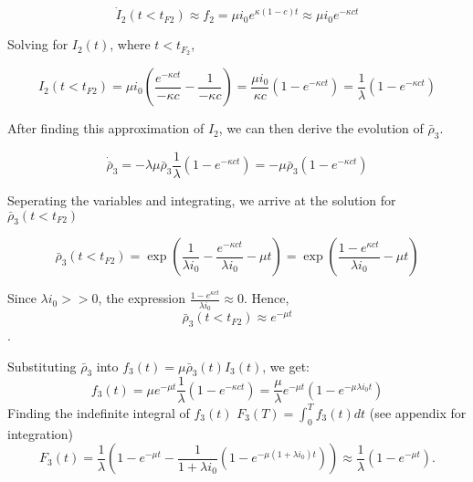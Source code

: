 \begin{equation}\dot I_2(t<t_{F2}) \approx f_2 = \mu i_0 e^{\kappa (1-c) t} \approx \mu i_0 e^{-\kappa c t}\end{equation}

Solving for $I_2(t)$, where $t<t_{F_2}$,

\begin{equation}I_2(t<t_{F2}) = \mu i_0 \left( \frac{e^{-\kappa c t}}{-\kappa c} - \frac{1}{-\kappa c} \right) = \frac{\mu i_0}{\kappa c}\left(1 - e^{-\kappa c t}\right) = \frac{1}{\lambda}\left(1-e^{-\kappa c t}\right) \end{equation}

After finding this approximation of $I_2$, we can then derive the evolution of $\bar \rho_3$. 

\begin{equation}\dot{\bar{\rho}}_3 = - \lambda \mu \bar{\rho}_3 \frac{1}{\lambda}\left(1 - e^{-\kappa c t}\right) =  - \mu \bar{\rho}_3\left(1 - e^{-\kappa c t}\right)\end{equation}

Seperating the variables and integrating, we arrive at the solution for $\bar \rho_3(t<t_{F2})$ 


\begin{equation}\bar \rho_3(t<t_{F2}) = \exp\left( \frac{1}{\lambda i_0} - \frac{e^{-\kappa c t}}{\lambda i_0}-\mu t\right) = \exp\left(\frac{1-e^{\kappa c t}}{\lambda i_0} - \mu t \right)\end{equation}

Since $\lambda i_0 >>0$, the expression $\frac{1-e^{\kappa c t}}{\lambda i_0} \approx 0$. Hence, $$\bar \rho_3(t<t_{F2}) \approx e^{-\mu t}$$.

Substituting $\bar \rho_3$ into $f_3(t)=\mu \bar \rho_3(t) I_3(t)$, we get:
\begin{equation}f_3(t)=\mu e^{-\mu t} \frac{1}{\lambda} \left(1-e^{-\kappa c t}\right) = \frac{\mu}{\lambda} e^{-\mu t}  \left(1-e^{-\mu \lambda i_0 t}\right)\end{equation}
Finding the indefinite integral of $f_3(t)$ $F_3(T) = \int_0^T f_3(t) dt$ (see appendix for integration)
\[
F_3(t) = \frac{1}{\lambda} \left( 1 - e^{-\mu t} - \frac{1}{1 + \lambda i_0} \left( 1 - e^{-\mu(1 + \lambda i_0) t} \right) \right) \approx \frac{1}{\lambda} \left( 1 - e^{-\mu t} \right).
\]

